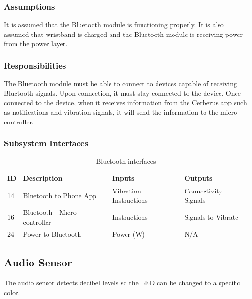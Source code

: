 \subsubsection{Assumptions}
It is assumed that the Bluetooth module is functioning properly. It is also assumed that wristband is charged and the Bluetooth module is receiving power from the power layer.

\subsubsection{Responsibilities}
The Bluetooth module must be able to connect to devices capable of receiving Bluetooth signals. Upon connection, it must stay connected to the device. Once connected to the device, when it receives information from the Cerberus app such as notifications and vibration signals, it will send the information to the micro-controller.

\subsubsection{Subsystem Interfaces}

\begin {table}[H]
\caption {Bluetooth interfaces} 
\begin{center}
    \begin{tabular}{ | p{1cm} | p{6cm} | p{3cm} | p{3cm} |}
    \hline
    ID & Description & Inputs & Outputs \\ \hline
    14 & Bluetooth to Phone App & Vibration Instructions & Connectivity Signals \\ \hline
    16 & Bluetooth - Micro-controller & Instructions & Signals to Vibrate \\ \hline
    24 & Power to Bluetooth & Power (W) & N/A \\ \hline
    \end{tabular}
\end{center}
\end{table}

\subsection{Audio Sensor}
The audio sensor detects decibel levels so the LED can be changed to a specific color.

